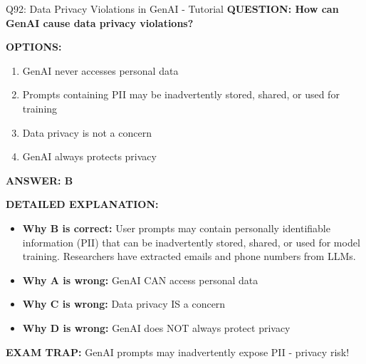 \documentclass[8pt]{beamer}
\begin{document}
	\begin{frame}{Q92: Data Privacy Violations in GenAI - Tutorial}
		\fontsize{6.5}{7.5}\selectfont
		\textbf{QUESTION: How can GenAI cause data privacy violations?}
		
		\vspace{0.1cm}
		\textbf{OPTIONS:}
		\begin{enumerate}
			\item GenAI never accesses personal data
			\item Prompts containing PII may be inadvertently stored, shared, or used for training
			\item Data privacy is not a concern
			\item GenAI always protects privacy
		\end{enumerate}
		
		\vspace{0.1cm}
		\textcolor{myblue}{\textbf{ANSWER: B}}
		
		\vspace{0.1cm}
		\textbf{DETAILED EXPLANATION:}
		\begin{itemize}
			\item \textbf{Why B is correct:} User prompts may contain personally identifiable information (PII) that can be inadvertently stored, shared, or used for model training. Researchers have extracted emails and phone numbers from LLMs.
			\item \textbf{Why A is wrong:} GenAI CAN access personal data
			\item \textbf{Why C is wrong:} Data privacy IS a concern
			\item \textbf{Why D is wrong:} GenAI does NOT always protect privacy
		\end{itemize}
		
		\textcolor{myred}{\textbf{EXAM TRAP:}} GenAI prompts may \textcolor{myblue}{inadvertently expose PII} - privacy risk!
	\end{frame}
	
\end{document}
